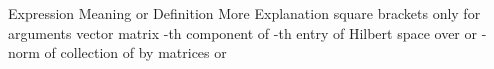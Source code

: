 {
{\tfx
\starttable[|l|l|l|] \HL
\NC Expression \VL Meaning or Definition \VL More Explanation \SR \HL
\NC {} \VL square brackets \VL only for arguments \AR \HL
\NC {} \VL vector \VL  \AR \HL
\NC {} \VL matrix \VL  \AR \HL
\NC {} \VL {}-th component of  \VL  \AR \HL
\NC {} \VL {}-th entry of  \VL  \AR \HL
\NC {} \VL Hilbert space  over  \VL {} or  \AR \HL
\NC {} \VL {}-norm of  \VL {} \AR \HL
\NC {} \VL collection of  by  matrices \VL {} or  \AR \HL
\stoptable
}
}


